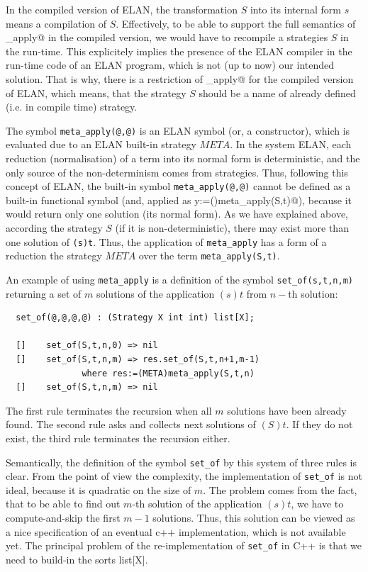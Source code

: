 \documentclass{article}
\begin{document}
     In the compiled version of ELAN,
     the transformation $S$ into its internal form $s$ means 
     a compilation of $S$.
     Effectively, to be able to support the full semantics of 
     \verb@meta_apply@ in the compiled version, we would have to
     recompile a strategies $S$ in the run-time. This explicitely
     implies the presence of the ELAN compiler in the run-time code
     of an ELAN program, which is not (up to now) our intended solution.
     That is why, there is a restriction of
     \verb@meta_apply@
     for the compiled version of ELAN, 
     which means, 
     that the strategy $S$ should 
     be a name of already defined (i.e. in compile time) strategy.
    
     The symbol \verb|meta_apply(@,@)| is an ELAN symbol (or, a constructor),
     which is evaluated due to an ELAN built-in strategy $META$.
     In the system ELAN, 
     each reduction (normalisation) 
     of a term into its normal form is deterministic,
     and the only source of the non-determinism comes from
     strategies.
     Thus, following this concept of ELAN,
     the built-in symbol
     \verb|meta_apply(@,@)| cannot be defined as a built-in functional
     symbol
     (and, applied as \verb@where y:=()meta_apply(S,t)@),
     because it would return only one solution (its normal form).
     As we have explained above, according the strategy $S$
     (if it is non-deterministic), there may exist more than one solution
     of \verb|(s)t|. Thus, the application of \verb|meta_apply| has
     a form of a reduction the strategy $META$ over the term
     \verb|meta_apply(S,t)|.

An example of using \verb|meta_apply| is a definition of the symbol
\verb|set_of(s,t,n,m)| returning
a set of $m$ solutions of the application $(s)t$ from $n-$th solution:
%
{\small
\begin{verbatim}
  set_of(@,@,@,@) : (Strategy X int int) list[X]; 

  []    set_of(S,t,n,0) => nil                    
  []    set_of(S,t,n,m) => res.set_of(S,t,n+1,m-1)
               where res:=(META)meta_apply(S,t,n) 
  []    set_of(S,t,n,m) => nil                    
\end{verbatim}}
%
The first rule terminates the recursion when all $m$ solutions
have been already found.
The second rule asks and collects 
next solutions of $(S)t$. If they do not exist, the third
rule terminates the recursion either.

Semantically, the definition of the symbol \verb|set_of|
by this system of three rules is clear.
From the point of view the complexity,
the implementation of \verb|set_of| is not ideal, because it is
quadratic on the size of $m$. The problem comes from the fact,
that to be able to find out $m$-th solution of the application
$(s)t$, we have to compute-and-skip the first $m-1$ solutions.
Thus, this solution can be viewed as a nice specification of
an eventual c++ implementation, which is not available yet.
The principal problem of the
re-implementation of \verb|set_of|
in C++ is that we need to build-in the sorts list[X].
\end{document}
